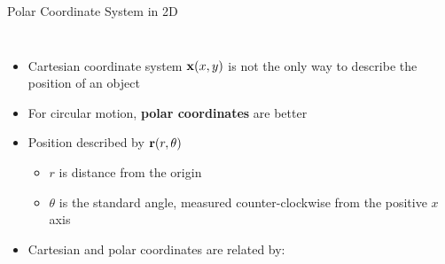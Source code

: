 \documentclass[12pt,compress,aspectratio=169]{beamer}
\newcommand{\mb}[1]{\ensuremath\mathbf{#1}}
\begin{document}
\begin{frame}{Polar Coordinate System in 2D}
  \begin{columns}
    \begin{itemize}
    \item Cartesian coordinate system $\mb{x}(x,y)$ is not the only way to
      describe the position of an object
    \item For circular motion, \textbf{polar coordinates} are better
    \item Position described by $\mb{r}(r,\theta)$
      \begin{itemize}
      \item $r$ is distance from the origin
      \item $\theta$ is the standard angle, measured counter-clockwise from the
        positive $x$ axis
      \end{itemize}
    \item Cartesian and polar coordinates are related by:

      \vspace{-.3in}{\large
        \begin{align*}
          x&=r\cos\theta\\
          y&=r\sin\theta
        \end{align*}
      }
    \end{itemize}
  \end{columns}
\end{frame}
\end{document}
